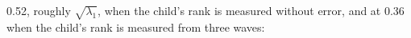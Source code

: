 0.52, roughly $\sqrt{\lambda_1}$, when the child's rank is measured without error, and at 0.36 when the child's rank is measured from three waves:%
